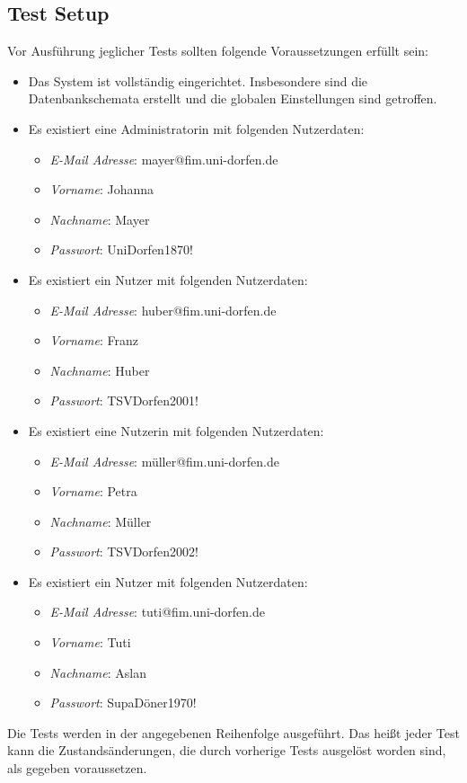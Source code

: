 \subsection{Test Setup}
Vor Ausführung jeglicher Tests sollten folgende Voraussetzungen erfüllt sein:
\begin{itemize}
	\item Das System ist vollständig eingerichtet.
	Insbesondere sind die Datenbankschemata erstellt und die globalen Einstellungen sind getroffen.
	\item Es existiert eine Administratorin mit folgenden Nutzerdaten:
	\begin{itemize}
		\item \emph{E-Mail Adresse}: mayer@fim.uni-dorfen.de
		\item \emph{Vorname}: Johanna
		\item \emph{Nachname}: Mayer
		\item \emph{Passwort}: UniDorfen1870!
	\end{itemize}
	\item Es existiert ein Nutzer mit folgenden Nutzerdaten:
	\begin{itemize}
		\item \emph{E-Mail Adresse}: huber@fim.uni-dorfen.de
		\item \emph{Vorname}: Franz
		\item \emph{Nachname}: Huber
		\item \emph{Passwort}: TSVDorfen2001!
	\end{itemize}
	\item Es existiert eine Nutzerin mit folgenden Nutzerdaten:
	\begin{itemize}
		\item \emph{E-Mail Adresse}: müller@fim.uni-dorfen.de
		\item \emph{Vorname}: Petra
		\item \emph{Nachname}: Müller
		\item \emph{Passwort}: TSVDorfen2002!
	\end{itemize}
	\item Es existiert ein Nutzer mit folgenden Nutzerdaten:
	\begin{itemize}
		\item \emph{E-Mail Adresse}: tuti@fim.uni-dorfen.de
		\item \emph{Vorname}: Tuti
		\item \emph{Nachname}: Aslan
		\item \emph{Passwort}: SupaDöner1970!
	\end{itemize}
\end{itemize}
Die Tests werden in der angegebenen Reihenfolge ausgeführt.
Das heißt jeder Test kann die Zustandsänderungen, die durch vorherige Tests ausgelöst worden sind, als gegeben voraussetzen.
